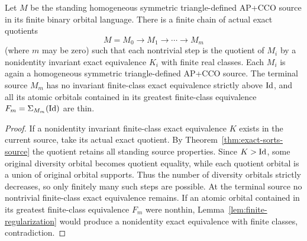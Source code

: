 \begin{lemma}
\label{lem:finite-exact-normalization-geometric}
Let $M$ be the standing homogeneous symmetric triangle-defined
AP+CCO source in its finite binary orbital language.  There is a
finite chain of actual exact quotients
\[
              M=M_0\longrightarrow M_1\longrightarrow\cdots
                 \longrightarrow M_m
\]
(where $m$ may be zero) such that each nontrivial step is the
quotient of $M_i$ by a nonidentity invariant exact equivalence
$K_i$ with finite real classes.  Each $M_i$ is again a homogeneous
symmetric triangle-defined AP+CCO source.  The terminal source
$M_m$ has no invariant finite-class exact equivalence strictly
above $\mathrm{Id}$, and all its atomic orbitals contained in its
greatest finite-class equivalence $F_m=\Sigma_{M_m}(\mathrm{Id})$ are thin.
\end{lemma}
\begin{proof}
If a nonidentity invariant finite-class exact equivalence $K$
exists in the current source, take its actual exact quotient.
By Theorem~\ref{thm:exact-sorts-source} the quotient retains all
standing source properties.  Since $K>\mathrm{Id}$, some original
diversity orbital becomes quotient equality, while each quotient
orbital is a union of original orbital supports.  Thus the number
of diversity orbitals strictly decreases, so only finitely many
such steps are possible.  At the terminal source no nontrivial
finite-class exact equivalence remains.  If an atomic orbital
contained in its greatest finite-class equivalence $F_m$ were
nonthin, Lemma~\ref{lem:finite-regularization} would produce a
nonidentity exact equivalence with finite classes, contradiction.
\end{proof}

